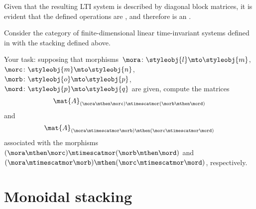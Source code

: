 Given that the resulting LTI system is described by diagonal block matrices, it is evident that the defined operations are , and therefore \LTI is an  .

\begin{gradedexercise}
    \label{ex:StackingLTI}

    Consider the category of finite-dimensional linear time-invariant systems defined in  with the stacking defined above.

    Your task:
    supposing that morphisms~$\mora\colon \styleobj{l}\mto \styleobj{m}$,~$\morc\colon \styleobj{m}\mto \styleobj{n}$,~$\morb\colon \styleobj{o}\mto \styleobj{p}$,~$\mord\colon \styleobj{p}\mto \styleobj{q}$ are given, compute the matrices
    \begin{equation}
        \mat{A}_{(\mora \mthen \morc)\mtimescatmor (\morb\mthen \mord)}
    \end{equation}
    and
    \begin{equation}
        \mat{A}_{(\mora\mtimescatmor \morb)\mthen (\morc\mtimescatmor \mord)}
    \end{equation}
    associated with the morphisms $(\mora \mthen \morc)\mtimescatmor (\morb\mthen \mord)$ and $(\mora\mtimescatmor \morb)\mthen (\morc\mtimescatmor \mord)$, respectively.
\end{gradedexercise}


\section{Monoidal stacking}\label{sec:moinoidal-stacking}

